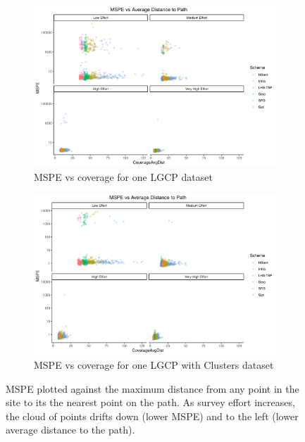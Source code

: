 \documentclass[review]{elsarticle}
\begin{document}
\begin{figure}

\begin{subfigure}{5in}
\includegraphics[width=5in]{../graphics/MSPE-Coverage-LGCP000004.png}
\caption{MSPE vs coverage for one LGCP dataset}
\label{covglgcp}
\end{subfigure}

\begin{subfigure}{5in}
\includegraphics[width=5in]{../graphics/MSPE-Coverage-Cluster000004.png}
\caption{MSPE vs coverage for one LGCP with Clusters dataset}
\label{covgclust}
\end{subfigure}

\caption{MSPE plotted against the maximum distance from any point in the site
to its the nearest point on the path. As survey effort increases, the cloud of
points drifts down (lower MSPE) and to the left (lower average distance to the
path).}
\label{covg}
\end{figure}
\end{document}

